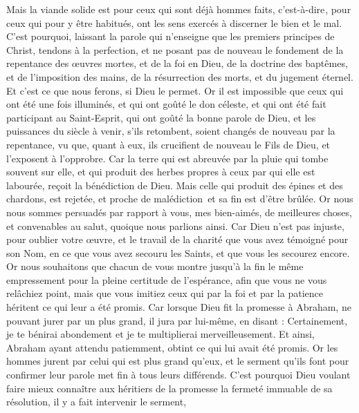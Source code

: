 \begin{multicols}{2}
Mais la viande solide est pour ceux qui sont déjà hommes faits, {c’est-à-dire }, pour ceux qui pour y être habitués, ont les sens exercés à discerner le bien et le mal.
\VerseOne{}C'est pourquoi, laissant la parole qui n’enseigne que les premiers principes de Christ, tendons à la perfection, et ne posant pas de nouveau le fondement de la repentance des œuvres mortes, et de la foi en Dieu,
de la doctrine des baptêmes, et de l'imposition des mains, de la résurrection des morts, et du jugement éternel.
Et c'est ce que nous ferons, si Dieu le permet.
Or il est impossible que ceux qui ont été une fois illuminés, et qui ont goûté le don céleste, et qui ont été fait participant au Saint-Esprit,
qui ont goûté la bonne parole de Dieu, et les puissances du siècle à venir,
s'ils retombent, soient changés de nouveau par la repentance, vu que, quant à eux, ils crucifient de nouveau le Fils de Dieu, et l’exposent à l’opprobre.
Car la terre qui est abreuvée par la pluie qui tombe souvent sur elle, et qui produit des herbes propres à ceux par qui elle est labourée, reçoit la bénédiction de Dieu.
Mais celle qui produit des épines et des chardons, est rejetée, et proche de malédiction et sa fin est d’être brûlée.
Or nous nous sommes persuadés par rapport à vous, mes bien-aimés, de meilleures choses, et convenables au salut, quoique nous parlions ainsi.
Car Dieu n’est pas injuste, pour oublier votre œuvre, et le travail de la charité que vous avez témoigné pour son Nom, en ce que vous avez secouru les Saints, et que vous les secourez encore.
Or nous souhaitons que chacun de vous montre jusqu’à la fin le même empressement pour la pleine certitude de l’espérance,
afin que vous ne vous relâchiez point, mais que vous imitiez ceux qui par la foi et par la patience héritent ce qui leur a été promis.
Car lorsque Dieu fit la promesse à Abraham, ne pouvant jurer par un plus grand, il jura par lui-même,
en disant : Certainement, je te bénirai abondement et je te multiplierai merveilleusement.
Et ainsi, Abraham ayant attendu patiemment, obtint ce qui lui avait été promis.
Or les hommes jurent par celui qui est plus grand qu'eux, et le serment qu'ils font pour confirmer leur parole met fin à tous leurs différends.
C'est pourquoi Dieu voulant faire mieux connaître aux héritiers de la promesse la fermeté immuable de sa résolution, il y a fait intervenir le serment,

\end{multicols}
